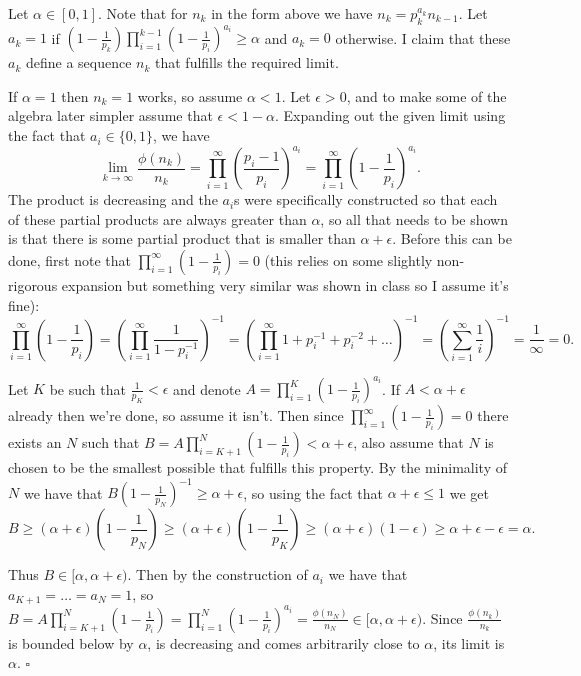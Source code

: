 \documentclass[letterpaper, reqno,11pt]{article}
\begin{document}
Let $\alpha\in [0,1]$. Note that for $n_k$ in the form above we have $n_k=p_k^{a_k}n_{k-1}$. Let $a_k=1$ if $\left( 1-\frac{1}{p_k} \right) \prod_{i=1}^{k-1}\left(1-\frac{1}{p_i}\right)^{a_i}\geq \alpha$ and $a_k=0$ otherwise. I claim that these $a_k$ define a sequence $n_k$ that fulfills the required limit.

If $\alpha=1$ then $n_k=1$ works, so assume $\alpha<1$. Let $\epsilon>0$, and to make some of the algebra later simpler assume that $\epsilon<1-\alpha$. Expanding out the given limit using the fact that $a_i\in \{0,1\}$, we have
\[
\lim_{k\to\infty}\frac{\phi(n_k)}{n_k}=\prod_{i=1}^{\infty}\left( \frac{p_i-1}{p_i} \right) ^{a_i}=\prod_{i=1}^{\infty}\left( 1-\frac{1}{p_i} \right) ^{a_i}
.\]
The product is decreasing and the $a_i$s were specifically constructed so that each of these partial products are always greater than $\alpha$, so all that needs to be shown is that there is some partial product that is smaller than $\alpha+\epsilon$. Before this can be done, first note that $\prod_{i=1}^{\infty}\left( 1-\frac{1}{p_i} \right) =0$ (this relies on some slightly non-rigorous expansion but something very similar was shown in class so I assume it's fine):
\[
    \prod_{i=1}^{\infty}\left( 1-\frac{1}{p_i} \right) =\left(\prod_{i=1}^{\infty}\frac{1}{1-p_i^{-1}}\right)^{-1}=\left(\prod_{i=1}^{\infty}1+p_i^{-1}+p_i^{-2}+\ldots\right)^{-1}=\left( \sum_{i=1}^{\infty}\frac{1}{i} \right) ^{-1}=\frac{1}{\infty}=0
.\]

Let $K$ be such that $\frac{1}{p_K}<\epsilon$ and denote $A=\prod_{i=1}^{K}\left( 1-\frac{1}{p_i} \right) ^{a_i}$. If $A<\alpha+\epsilon$ already then we're done, so assume it isn't. Then since $\prod_{i=1}^{\infty}\left( 1-\frac{1}{p_i} \right) =0$ there exists an $N$ such that $B=A\prod_{i=K+1}^{N}\left( 1-\frac{1}{p_i} \right)<\alpha+\epsilon$, also assume that $N$ is chosen to be the smallest possible that fulfills this property. By the minimality of $N$ we have that $B\left( 1-\frac{1}{p_N} \right) ^{-1}\geq \alpha+\epsilon$, so using the fact that $\alpha+\epsilon\leq 1$ we get
\[
B\geq \left( \alpha+\epsilon \right) \left( 1-\frac{1}{p_N} \right)\geq \left( \alpha+\epsilon \right) \left( 1-\frac{1}{p_K} \right)\geq \left( \alpha+\epsilon \right) (1-\epsilon)\geq \alpha+\epsilon-\epsilon=\alpha
.\]

Thus $B\in [\alpha, \alpha+\epsilon)$. Then by the construction of $a_i$ we have that $a_{K+1}=\ldots=a_{N}=1$, so $B=A\prod_{i=K+1}^{N}\left( 1-\frac{1}{p_i} \right)=\prod_{i=1}^{N}\left( 1-\frac{1}{p_i} \right) ^{a_i}=\frac{\phi(n_N)}{n_N}\in [\alpha,\alpha+\epsilon)$. Since $\frac{\phi(n_k)}{n_k}$ is bounded below by $\alpha$, is decreasing and comes arbitrarily close to $\alpha$, its limit is $\alpha$. $\square$
\end{document}
